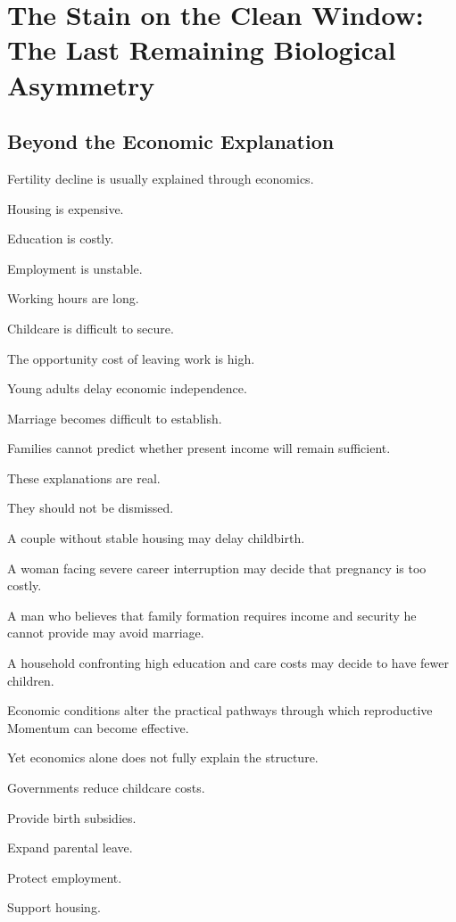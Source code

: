 

\section{The Stain on the Clean Window: The Last Remaining Biological Asymmetry}

\subsection*{\textbf{Beyond the Economic Explanation}}

Fertility decline is usually explained through economics.

Housing is expensive.

Education is costly.

Employment is unstable.

Working hours are long.

Childcare is difficult to secure.

The opportunity cost of leaving work is high.

Young adults delay economic independence.

Marriage becomes difficult to establish.

Families cannot predict whether present income will remain sufficient.

These explanations are real.

They should not be dismissed.

A couple without stable housing may delay childbirth.

A woman facing severe career interruption may decide that pregnancy is too costly.

A man who believes that family formation requires income and security he cannot provide may avoid marriage.

A household confronting high education and care costs may decide to have fewer children.

Economic conditions alter the practical pathways through which reproductive Momentum can become effective.

Yet economics alone does not fully explain the structure.

Governments reduce childcare costs.

Provide birth subsidies.

Expand parental leave.

Protect employment.

Support housing.

